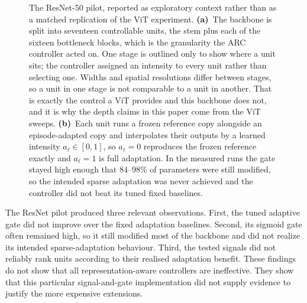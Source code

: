\documentclass[11pt]{article}
\begin{document}
\begin{figure}[t]
\caption{The ResNet-50 pilot, reported as exploratory context rather than as a
matched replication of the ViT experiment. \textbf{(a)}~The backbone is split
into seventeen controllable units, the stem plus each of the sixteen bottleneck
blocks, which is the granularity the ARC controller acted on. One stage is
outlined only to show where a unit sits; the controller assigned an intensity to
every unit rather than selecting one. Widths and spatial resolutions differ
between stages, so a unit in one stage is not comparable to a unit in another.
That is exactly the control a ViT provides and this backbone does not, and it is
why the depth claims in this paper come from the ViT sweeps.
\textbf{(b)}~Each unit runs a frozen reference copy alongside an episode-adapted
copy and interpolates their outputs by a learned intensity $a_\ell\in[0,1]$, so
$a_\ell=0$ reproduces the frozen reference exactly and $a_\ell=1$ is full
adaptation. In the measured runs the gate stayed high enough that $84$--$98\%$ of
parameters were still modified, so the intended sparse adaptation was never
achieved and the controller did not beat its tuned fixed baselines.}
\label{fig:resnetarch}
\end{figure}

The ResNet pilot produced three relevant observations. First, the tuned adaptive gate did not improve over the fixed adaptation baselines. Second, its sigmoid gate often remained high, so it still modified most of the backbone and did not realize its intended sparse-adaptation behaviour. Third, the tested signals did not reliably rank units according to their realised adaptation benefit. These findings do not show that all representation-aware controllers are ineffective. They show that this particular signal-and-gate implementation did not supply evidence to justify the more expensive extensions.
\end{document}
